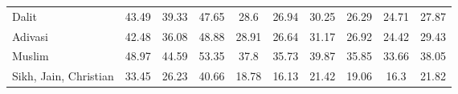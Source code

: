 \begin{tabular}{l*{9}{c}}
Dalit               &       43.49&       39.33&       47.65&        28.6&       26.94&       30.25&       26.29&       24.71&       27.87\\
Adivasi             &       42.48&       36.08&       48.88&       28.91&       26.64&       31.17&       26.92&       24.42&       29.43\\
Muslim              &       48.97&       44.59&       53.35&        37.8&       35.73&       39.87&       35.85&       33.66&       38.05\\
Sikh, Jain, Christian&       33.45&       26.23&       40.66&       18.78&       16.13&       21.42&       19.06&        16.3&       21.82\\
\bottomrule
\end{tabular}
